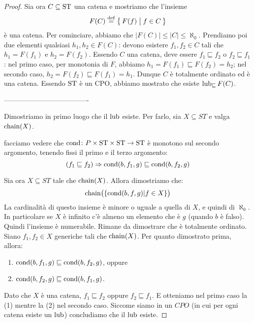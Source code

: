 \begin{proof}
Sia ora $C \subseteq \mathrm{ST}$ una catena e mostriamo che l'insieme
\[
  F(C) \defeq \bigl\{\, F(f) \bigm| f \in C \,\bigr\}
\]
\`e una catena.
Per cominciare, abbiamo che $\bigl|F(C)\bigr| \leq |C| \leq \aleph_0$.
Prendiamo poi due elementi qualsiasi $h_1, h_2 \in F(C)$:
devono esistere $f_1, f_2 \in C$ tali che $h_1 = F(f_1)$ e $h_2 = F(f_2)$.
Essendo $C$ una catena, deve essere $f_1 \sqsubseteq f_2$
o $f_2 \sqsubseteq f_1$: nel primo caso, per monotonia di $F$, abbiamo
$h_1 = F(f_1) \sqsubseteq F(f_2) = h_2$;
nel secondo caso,
$h_2 = F(f_2) \sqsubseteq F(f_1) = h_1$.
Dunque $C$ \`e totalmente ordinato ed \`e una catena.
Essendo $\mathrm{ST}$ \`e un CPO, abbiamo mostrato che esiste $\mathop{\mathrm{lub}}\nolimits_{\sqsubseteq} F(C)$.

-------------------------------------


Dimostriamo in primo luogo che il $\mathop{\mathrm{lub}}\nolimits$ esiste.
Per farlo, sia $ X \subseteq ST$ e valga $\mathop{\mathrm{chain}}\nolimits(X)$.


facciamo vedere che $\mathord{\mathrm{cond}}\colon P \times \mathrm{ST} \times \mathrm{ST}\to\mathrm{ST}$
è monotono sul
secondo argomento, tenendo fissi il primo e il terzo argomento:
\[
  (f_1 \sqsubseteq f_2) \Rightarrow \mathrm{cond}(b,f_{1},g) \sqsubseteq \mathrm{cond}(b,f_{2},g)
\]

Sia ora $ X \subseteq ST$ tale che $\mathop{\mathrm{chain}}\nolimits(X) $. Allora dimostriamo che:
\[
  \mathop{\mathrm{chain}}\nolimits\bigl( \{\mathrm{cond}(b,f,g) | f \in X\}\bigr)
\]
La cardinalità di questo insieme è minore o uguale
a quella di $X$, e quindi di $\aleph_0$.
In particolare se $X$ è infinito c'è almeno un elemento
che è $g$ (quando $b$ è falso). Quindi l'insieme è numerabile.
Rimane da dimostrare che è totalmente ordinato.
Siano $f_1,f_2 \in X$ generiche tali che $\mathop{\mathrm{chain}}\nolimits(X)$.
Per quanto dimostrato prima, allora:
\begin{enumerate}
  \item $\mathrm{cond}(b,f_1,g) \sqsubseteq \mathrm{cond}(b,f_2,g)$, oppure
  \item $\mathrm{cond}(b,f_2,g) \sqsubseteq \mathrm{cond}(b,f_1,g)$.
\end{enumerate}
Dato che $X$ è una catena, $f_1 \sqsubseteq f_2$ oppure
$f_2 \sqsubseteq f_1 $. E otteniamo nel primo caso la (1)
mentre la (2) nel secondo caso.
Siccome siamo in un $CPO$ (in cui per ogni catena esiste
un $\mathop{\mathrm{lub}}\nolimits$) concludiamo che il $\mathop{\mathrm{lub}}\nolimits$ esiste.


\end{proof}
